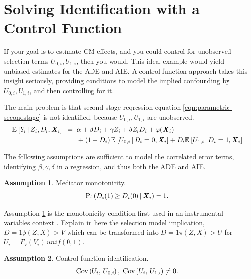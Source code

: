 \section{Solving Identification with a Control Function}
\label{sec:selectionmodel}
If your goal is to estimate CM effects, and you could control for unobserved selection terms $U_{0,i}, U_{1,i}$, then you would.
This ideal example would yield unbiased estimates for the ADE and AIE.
A control function approach takes this insight seriously, providing conditions to model the implied confounding by $U_{0,i}, U_{1,i}$, and then controlling for it.

The main problem is that second-stage reqression equation \eqref{eqn:parametric-secondstage} is not identified, because $U_{0,i},U_{1,i}$ are unobserved.
\begin{align*}
    \mathbb{E}_{} \left[ Y_i \, \middle\vert \, Z_i, D_i, \boldsymbol{\mathit{X}}_i \right] \;\; =& \;\;
        \alpha
        + \beta D_i
        + \gamma Z_i
        + \delta Z_i D_i
        + \varphi(\boldsymbol{\mathit{X}}_i) \\
        & \;\; +\left( 1 - D_i \right) \mathbb{E}_{} \left[  U_{0,i}  \, \middle\vert \, D_i = 0, \boldsymbol{\mathit{X}}_i \right]
            + D_i \mathbb{E}_{} \left[  U_{1,i}  \, \middle\vert \, D_i = 1, \boldsymbol{\mathit{X}}_i \right]
\end{align*}


The following assumptions are sufficient to model the correlated error terms, identifying $\beta, \gamma, \delta$ in a regression, and thus both the ADE and AIE.

%
\theoremstyle{definition}
\newtheorem{assumptionCF}{Assumption}
\renewcommand\theassumptionCF{CF--\arabic{assumptionCF}}
\begin{assumptionCF}
    \label{cf:monotonicity}
    Mediator monotonicity.
    \[ \Pr\left(  D_i(1) \geq D_i(0)  \, \middle\vert \, \boldsymbol{\mathit{X}}_i \right) = 1. \]
\end{assumptionCF}

Assumption \ref{cf:monotonicity} is the monotonicity condition first used in an instrumental variables context \citep{imbens1994identification}.
Explain in here the selection model implication, $D = 1{ \phi(Z, X) > V }$ which can be transformed into $D = 1{ \pi(Z, X) > U }$ for $U_i = F_V(V_i) ~ unif(0, 1)$.

\begin{assumptionCF}
    \label{cf:identification}
    Control function identification.
    \[ \text{Cov} \left( U_i, \, U_{0,i} \right), \; \text{Cov} \left( U_i, \, U_{1,i} \right) \neq 0. \]
\end{assumptionCF}

